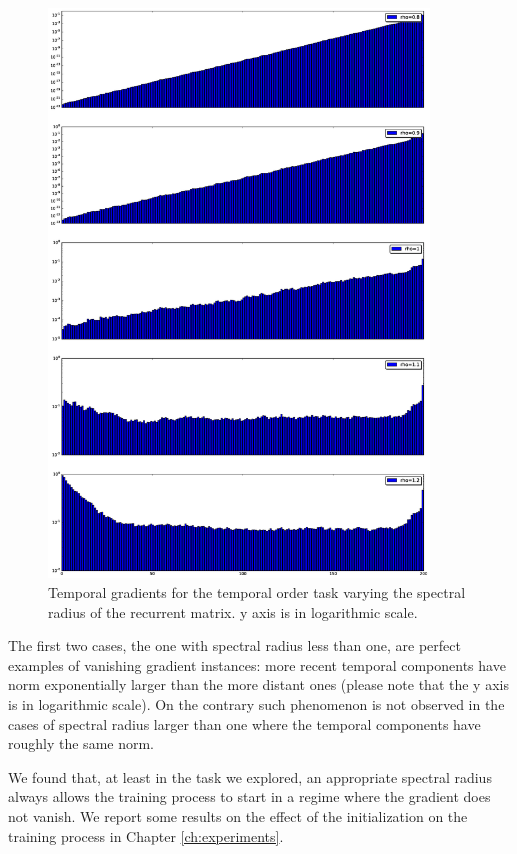\begin{figure}
    \includegraphics[width=0.9\textwidth]{chapter3/temporal_components.eps}
    \caption{Temporal gradients for the temporal order task varying the spectral radius of the recurrent matrix. y axis is in logarithmic scale.}
    \label{fig:temporal_norms}
\end{figure}

The first two cases, the one with spectral radius less than one, are perfect examples of vanishing gradient instances: more recent temporal components have norm exponentially larger than the more distant ones (please note that the y axis is in logarithmic scale). On the contrary such phenomenon is not observed in the cases of spectral radius larger than one where the temporal components have roughly the same norm.

We found that, at least in the task we explored, an appropriate spectral radius always allows the training process to start in a regime where the gradient does not vanish. We report some results on the effect of the initialization on the training process in Chapter \ref{ch:experiments}.

